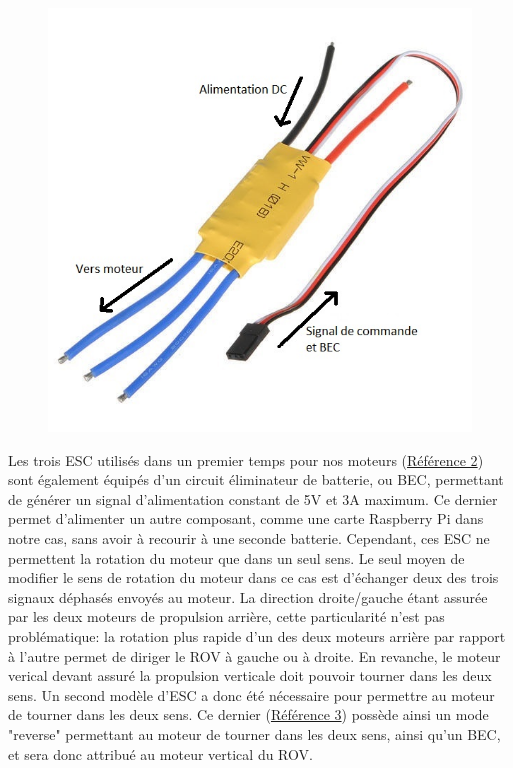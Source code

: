 \documentclass[a4paper,11pt]{report}
\begin{document}
			\begin{figure}[!h]
				\begin{center}
					\includegraphics[scale=2]{Photos/esc}
				\end{center}
			\end{figure}
			\newpage 
			Les trois ESC utilisés dans un premier temps pour nos moteurs (\href{https://www.robotshop.com/eu/fr/esc-multirotor-20a-m20a.html}{Référence 2}) sont également équipés d'un circuit éliminateur de batterie, ou BEC, permettant de générer un signal d'alimentation constant de 5V et 3A maximum. Ce dernier permet d'alimenter un autre composant, comme une carte Raspberry Pi dans notre cas, sans avoir à recourir à une seconde batterie. 
			\newline\newline Cependant, ces ESC ne permettent la rotation du moteur que dans un seul sens. Le seul moyen de modifier le sens de rotation du moteur dans ce cas est d'échanger deux des trois signaux déphasés envoyés au moteur. La direction droite/gauche étant assurée par les deux moteurs de propulsion arrière, cette particularité n'est pas problématique: la rotation plus rapide d'un des deux moteurs arrière par rapport à l'autre permet de diriger le ROV à gauche ou à droite. En revanche, le moteur verical devant assuré la propulsion verticale doit pouvoir tourner dans les deux sens. Un second modèle d'ESC a donc été nécessaire pour permettre au moteur de tourner dans les deux sens. Ce dernier (\href{https://hobbyking.com/fr_fr/hobbykingr-tm-brushless-car-esc-30a-w-reverse.html}{Référence 3}) possède ainsi un mode "reverse" permettant au moteur de tourner dans les deux sens, ainsi qu'un BEC, et sera donc attribué au moteur vertical du ROV.
	
\end{document}
